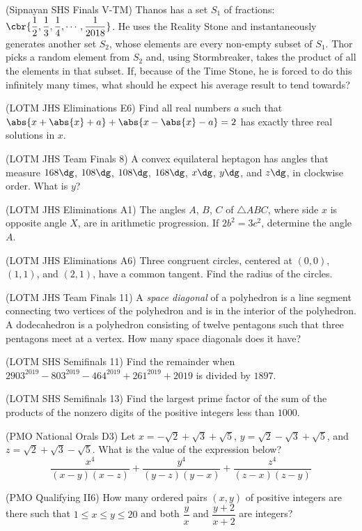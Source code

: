 (Sipnayan SHS Finals V-TM) Thanos has a set $S_1$ of fractions: $\cbr{\dfrac12, \dfrac13, \dfrac14, \cdots, \dfrac1{2018}}$. He uses the Reality Stone and instantaneously generates another set $S_2$, whose elements are every non-empty subset of $S_1$. Thor picks a random element from $S_2$ and, using Stormbreaker, takes the product of all the elements in that subset. If, because of the Time Stone, he is forced to do this infinitely many times, what should he expect his average result to tend towards?

(LOTM JHS Eliminations E6) Find all real numbers $a$ such that $\abs{x + \abs{x} + a} + \abs{x - \abs{x} - a} = 2$ has exactly three real solutions in $x$. 

(LOTM JHS Team Finals 8) A convex equilateral heptagon has angles that measure $168\dg$, $108\dg$, $108\dg$, $168\dg$, $x\dg$, $y\dg$, and $z\dg$, in clockwise order. What is $y$?

(LOTM JHS Eliminations A1) The angles $A$, $B$, $C$ of $\triangle ABC$, where side $x$ is opposite angle $X$, are in arithmetic progression. If $2b^2 = 3c^2$, determine the angle $A$.

(LOTM JHS Eliminations A6) Three congruent circles, centered at $(0, 0)$, $(1, 1)$, and $(2, 1)$, have a common tangent. Find the radius of the circles.

(LOTM JHS Team Finals 11) A \emph{space diagonal} of a polyhedron is a line segment connecting two vertices of the polyhedron and is in the interior of the polyhedron. A dodecahedron is a polyhedron consisting of twelve pentagons such that three pentagons meet at a vertex. How many space diagonals does it have?

(LOTM SHS Semifinals 11) Find the remainder when $2903^{2019} - 803^{2019} - 464^{2019} + 261^{2019} + 2019$ is divided by $1897$.

(LOTM SHS Semifinals 13) Find the largest prime factor of the sum of the products of the nonzero digits of the positive integers less than $1000$.

(PMO National Orals D3) Let $x = -\sqrt2 + \sqrt3 + \sqrt5$, $y = \sqrt2 - \sqrt3 + \sqrt5$, and $z = \sqrt2 + \sqrt3 - \sqrt5$. What is the value of the expression below? $$\frac{x^4}{(x-y)(x-z)} + \frac{y^4}{(y-z)(y-x)} + \frac{z^4}{(z-x)(z-y)}$$

(PMO Qualifying II6) How many ordered pairs $(x, y)$ of positive integers are there such that $1 \le x \le y \le 20$ and both $\dfrac yx$ and $\dfrac{y+2}{x+2}$ are integers?


